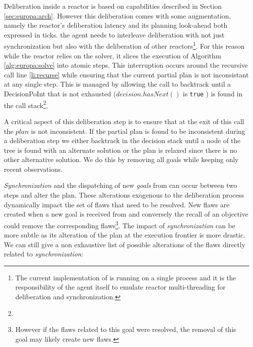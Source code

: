 Deliberation inside a reactor is based on \eu capabilities described
in Section \ref{sec:europa:arch}. However this deliberation comes with
some augmentation, namely the reactor's deliberation latency
\kcomment{($\lambda$)} and its planning look-ahead \kcomment{($\pi$)}
both expressed in ticks.  the agent needs to
interleave deliberation with not just synchronization but also with
the deliberation of other reactors\footnote{The current implementation
  of \rx is running on a single process and it is the responsibility
  of the agent itself to emulate reactor multi-threading for
  deliberation and synchronization.}.  For this reason while the
reactor relies on the \eu solver, it slices the execution of Algorithm
\ref{alg:europa:solve} into atomic steps. This interruption occurs
around the recursive call line \ref{li:recurse} while ensuring that
the current partial plan is not inconsistant at any single step. This
is managed by allowing the call to backtrack until a
\textsf{DecisionPoInt} that is not exhausted (\ie $decision.hasNext()$
is \texttt{true} ) is found in the call
stack\footnote{}.

A critical aspect of this deliberation step is to ensure that at the
exit of this call the $plan$ is not inconsistent. %
If the partial plan is found to be inconsistent during a deliberation
step we either backtrack in the decision stack until a node of the
 tree is found with an alternate solution or the plan
is relaxed since there is no other alternative solution. We do this by
removing all goals while keeping only recent observations.

{\em Synchronization} and the dispatching of new {\em goals} from \rx
can occur between two steps and alter the plan. These alterations
exogenous to the deliberation process dynamically impact the set of
flaws that need to be resolved. New flaws are created when a new goal
is received from \rx and conversely the recall of an objective could
remove the corresponding flaws\footnote{However if the flaws related
  to this goal were resolved, the removal of this goal may likely
  create new flaws.}. The impact of {\em synchronization} can be more
subtle as its alteration of the plan at the execution frontier is more
drastic. We can still give a non exhaustive list of possible
alterations of the flaws directly related to {\em synchronization}:

